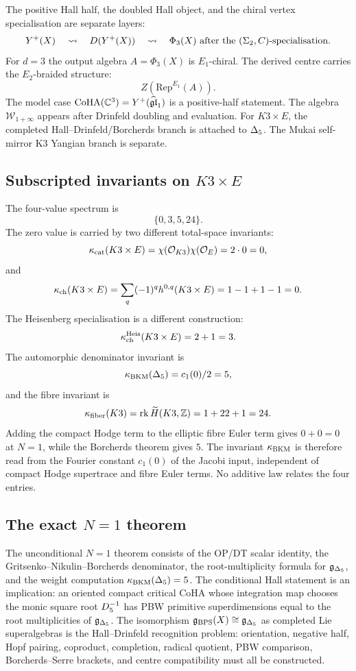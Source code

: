 The positive Hall half, the doubled Hall object, and the chiral vertex
specialisation are separate layers:
\[
 Y^{+}(X)
 \quad\rightsquigarrow\quad
 D(Y^{+}(X))
 \quad\rightsquigarrow\quad
 \Phi_3(X) \text{ after the } (\Sigma_2,C)\text{-specialisation}.
\]
For $d=3$ the output algebra $A=\Phi_3(X)$ is $E_1$-chiral.
The derived centre carries the $E_2$-braided structure:
\[
 Z(\mathrm{Rep}^{E_1}(A)).
\]
The model case
$\mathrm{CoHA}(\mathbb{C}^3)=Y^+(\widehat{\mathfrak{gl}}_1)$ is a positive-half
statement. The algebra $\mathcal{W}_{1+\infty}$ appears after Drinfeld
doubling and evaluation. For $K3\times E$, the completed
Hall--Drinfeld/Borcherds branch is attached to $\Delta_{5}$. The Mukai
self-mirror K3 Yangian branch is separate.

\subsection*{Subscripted invariants on $K3\times E$}

The four-value spectrum is
\[
 \{0,3,5,24\}.
\]
The zero value is carried by two different total-space invariants:
\[
 \kappa_{\mathrm{cat}}(K3\times E)
 =
 \chi(\mathcal{O}_{K3})\chi(\mathcal{O}_E)
 =
 2\cdot 0
 =
 0,
\]
and
\[
 \kappa_{\mathrm{ch}}(K3\times E)
 =
 \sum_q(-1)^q h^{0,q}(K3\times E)
 =
 1-1+1-1
 =
 0.
\]
The Heisenberg specialisation is a different construction:
\[
 \kappa_{\mathrm{ch}}^{\mathrm{Heis}}(K3\times E)=2+1=3.
\]
The automorphic denominator invariant is
\[
 \kappa_{\mathrm{BKM}}(\Delta_{5})=c_1(0)/2=5,
\]
and the fibre invariant is
\[
 \kappa_{\mathrm{fiber}}(K3)=\operatorname{rk}\widetilde H(K3,\mathbb{Z})=1+22+1=24.
\]
Adding the compact Hodge term to the elliptic fibre Euler term gives
$0+0=0$ at $N=1$, while the Borcherds theorem gives $5$. The invariant
$\kappa_{\mathrm{BKM}}$ is therefore read from the Fourier constant $c_1(0)$ of the
Jacobi input, independent of compact Hodge supertrace and fibre Euler
terms. No additive law relates the four entries.

\subsection*{The exact $N=1$ theorem}

The unconditional $N=1$ theorem consists of the OP/DT scalar identity,
the Gritsenko--Nikulin--Borcherds denominator, the root-multiplicity
formula for $\mathfrak{g}_{\Delta_{5}}$, and the weight computation
$\kappa_{\mathrm{BKM}}(\Delta_{5})=5$. The conditional Hall statement is an implication:
an oriented compact critical CoHA whose integration map chooses the
monic square root $D_{5}^{-1}$ has PBW primitive superdimensions equal
to the root multiplicities of $\mathfrak{g}_{\Delta_{5}}$. The isomorphism
$\mathfrak{g}_{\mathrm{BPS}}(X)\cong\mathfrak{g}_{\Delta_{5}}$ as completed Lie superalgebras is the
Hall--Drinfeld recognition problem: orientation, negative half, Hopf
pairing, coproduct, completion, radical quotient, PBW comparison,
Borcherds--Serre brackets, and centre compatibility must all be
constructed.
